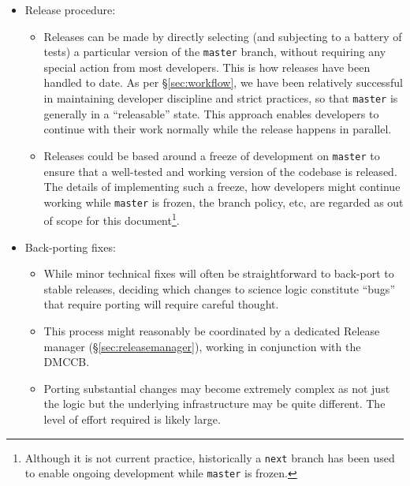 \documentclass[DM,toc]{lsstdoc}
\begin{document}
\begin{itemize}

  \item{Release procedure:

    \begin{itemize}

      \item{Releases can be made by directly selecting (and subjecting to a
      battery of tests) a particular version of the \texttt{master} branch,
      without requiring any special action from most developers. This is how
      releases have been handled to date. As per \S\ref{sec:workflow}, we have
      been relatively successful in maintaining developer discipline and
      strict practices, so that \texttt{master} is generally in a
      ``releasable'' state. This approach enables developers to continue with
      their work normally while the release happens in parallel.}

      \item{Releases could be based around a freeze of development on
      \texttt{master} to ensure that a well-tested and working version of the
      codebase is released. The details of implementing such a freeze, how
      developers might continue working while \texttt{master} is frozen, the
      branch policy, etc, are regarded as out of scope for this
      document\footnote{Although it is not current practice, historically a
      \texttt{next} branch has been used to enable ongoing development while
      \texttt{master} is frozen.}.}

    \end{itemize}

  }

  \item{Back-porting fixes:

    \begin{itemize}

      \item{While minor technical fixes will often be straightforward to
      back-port to stable releases, deciding which changes to science logic
      constitute ``bugs'' that require porting will require careful thought.}

      \item{This process might reasonably be coordinated by a dedicated
      Release manager (\S\ref{sec:releasemanager}), working in conjunction with
      the DMCCB.}

      \item{Porting substantial changes may become extremely complex as not
      just the logic but the underlying infrastructure may be quite different.
      The level of effort required is likely large.}


\end{itemize}}
\end{itemize}
\end{document}
